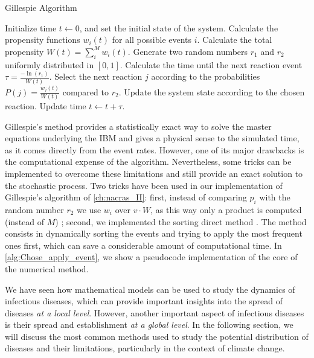 \begin{algorithm}[H]
  \caption{Gillespie Algorithm}
  \label{alg:gillespie}
  \begin{algorithmic}[1]
    \State Initialize time $t \gets 0$, and set the initial state of the
    system.
    \State Calculate the propensity functions $w_i(t)$ for all possible
    events $i$.
    \State Calculate the total propensity $W(t) = \sum_i^M w_i(t)$.
    \State Generate two random numbers $r_1$ and $r_2$ uniformly
    distributed in $[0,1]$.
    \State Calculate the time until the next reaction event $\tau =
      \frac{-\ln(r_1)}{W(t)}$.
    \State Select the next reaction $j$ according to the probabilities
    $P(j) = \frac{w_j(t)}{W(t)}$ compared to $r_2$.
    \State Update the system state according to the chosen reaction.
    \State Update time $t \gets t + \tau$.
    \EndWhile
  \end{algorithmic}
\end{algorithm}

Gillespie's method provides a statistically exact way to solve the
master equations underlying the IBM and gives a physical sense to the
simulated time, as it comes directly from the event rates. However, one of its
major drawbacks is the computational expense of the algorithm. Nevertheless,
some tricks can be implemented to overcome these limitations and still provide
an exact solution to the stochastic process. Two tricks have been used in our
implementation of Gillespie's algorithm of \cref{ch:nacras_II}: first,
instead of comparing $p_i$ with the random number $r_2$ we use $w_i$ over
$v\cdot W$, as this way only a product is computed (instead of $M$)
\cite{Toral_master_eqs}; second, we implemented the sorting direct method
\cite{MCCOLLUM200639}. The method consists in dynamically sorting the events
and trying to apply the most frequent ones first, which can save a considerable
amount of computational time. In \cref{alg:Chose_apply_event}, we show a
pseudocode implementation of the core of the numerical method.

We have seen how mathematical models can be used to study the dynamics of
infectious diseases, which can provide important insights into the spread of
diseases \textit{at a local level}. However, another important aspect of
infectious diseases is their spread and establishment \textit{at a global
  level}. In the following section, we will discuss the most common methods
used to study the potential distribution of diseases and their limitations,
particularly in the context of climate change.

